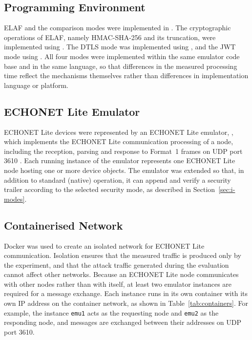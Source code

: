 \subsection{Programming Environment}
\label{sec:i-lang}

ELAF and the comparison modes were implemented in \tbd{}. The cryptographic operations of ELAF, namely HMAC-SHA-256 and its truncation, were implemented using \tbd{}. The DTLS mode was implemented using \tbd{}, and the JWT mode using \tbd{}. All four modes were implemented within the same emulator code base and in the same language, so that differences in the measured processing time reflect the mechanisms themselves rather than differences in implementation language or platform.

\subsection{ECHONET Lite Emulator}
\label{sec:i-emulator}

ECHONET Lite devices were represented by an ECHONET Lite emulator, \tbd{}, which implements the ECHONET Lite communication processing of a node, including the reception, parsing and response to Format~1 frames on UDP port 3610 \citep{ECHONETPart2}. Each running instance of the emulator represents one ECHONET Lite node hosting one or more device objects. The emulator was extended so that, in addition to standard (native) operation, it can append and verify a security trailer according to the selected security mode, as described in Section~\ref{sec:i-modes}.

\subsection{Containerised Network}
\label{sec:i-docker}

Docker was used to create an isolated network for ECHONET Lite communication. Isolation ensures that the measured traffic is produced only by the experiment, and that the attack traffic generated during the evaluation cannot affect other networks. Because an ECHONET Lite node communicates with other nodes rather than with itself, at least two emulator instances are required for a message exchange. Each instance runs in its own container with its own IP address on the container network, as shown in Table~\ref{tab:containers}. For example, the instance \texttt{emu1} acts as the requesting node and \texttt{emu2} as the responding node, and messages are exchanged between their addresses on UDP port 3610.

